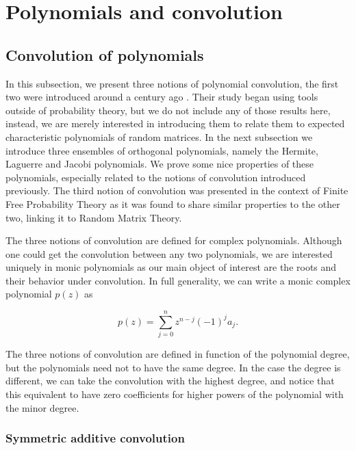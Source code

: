 \section{Polynomials and convolution} \label{sec:polynomials}

\subsection{Convolution of polynomials}

In this subsection, we present three notions of polynomial convolution, the first two were introduced around a century ago \cite{walsh1922location} \cite{szeg1939orthogonal}. Their study began using tools outside of probability theory, but we do not include any of those results here, instead, we are merely interested in introducing them to relate them to expected characteristic polynomials of random matrices. In the next subsection we introduce three ensembles of orthogonal polynomials, namely the Hermite, Laguerre and Jacobi polynomials. We prove some nice properties of these polynomials, especially related to the notions of convolution introduced previously.  The third notion of convolution was presented in the context of Finite Free Probability Theory \cite{article:finitefree} as it was found to share similar properties to the other two, linking it to Random Matrix Theory.

The three notions of convolution are defined for complex polynomials. Although one could get the convolution between any two polynomials, we are interested uniquely in monic polynomials as our main object of interest are the roots and their behavior under convolution. In full generality, we can write a monic complex polynomial $p(z)$ as

\begin{equation*}
    p(z) = \sum_{j=0}^n z^{n-j}(-1)^{j}a_j.
\end{equation*}

The three notions of convolution are defined in function of the polynomial degree, but the polynomials need not to have the same degree. In the case the degree is different, we can take the convolution with the highest degree, and notice that this equivalent to have zero coefficients for higher powers of the polynomial with the minor degree.

\subsubsection{Symmetric additive convolution}

